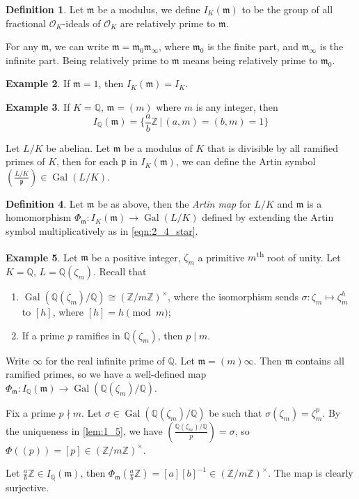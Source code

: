\documentclass[11pt]{article}
\theoremstyle{definition}
\newtheorem{definition}{Definition}[section]
\newtheorem{example}[definition]{Example}
\theoremstyle{plain}
\theoremstyle{remark}
\DeclareMathOperator{\Gal}{Gal}
\newcommand{\ZZ}{\mathbb{Z}}
\newcommand{\QQ}{\mathbb{Q}}
\newcommand{\cO}{\mathcal{O}}
\newcommand{\fp}{\mathfrak{p}}
\newcommand{\fm}{\mathfrak{m}}
\newcommand{\leg}[2]{\left(\frac{#1}{#2}\right)}
\begin{document}
\begin{definition}\label{def:2_7}
    Let $\fm$ be a modulus, we define $I_K(\fm)$ to be the group of all fractional $\cO_K$-ideals of $\cO_K$ are relatively prime to $\fm$.
\end{definition}

For any $\fm$, we can write $\fm = \fm_0 \fm_\infty$, where $\fm_0$ is the finite part, and $\fm_\infty$ is the infinite part. Being relatively prime to $\fm$ means being relatively prime to $\fm_0$.

\begin{example}\label{eg:2_8}
    If $\fm = 1$, then $I_K(\fm) = I_K$.
\end{example}

\begin{example}\label{eg:2_9}
    If $K = \QQ$, $\fm = (m)$ where $m$ is any integer, then
    \begin{equation*}
        I_\QQ(\fm) = \bigg\{ \frac{a}{b}\ZZ \,\bigg\vert\, (a, m) = (b, m) = 1 \bigg\}
    \end{equation*}
\end{example}

Let $L/K$ be abelian. Let $\fm$ be a modulus of $K$ that is divisible by all ramified primes of $K$, then for each $\fp$ in $I_K(\fm)$, we can define the Artin symbol $\leg{L/K}{\fp} \in \Gal(L/K)$.

\begin{definition}\label{def:2_10}
    Let $\fm$ be as above, then the \emph{Artin map} for $L/K$ and $\fm$ is a homomorphism $\Phi_{\fm} : I_K(\fm) \to \Gal(L/K)$ defined by extending the Artin symbol multiplicatively as in \eqref{eqn:2_4_star}.
\end{definition}

\begin{example}\label{eg:2_11}
    Let $\fm$ be a positive integer, $\zeta_m$ a primitive $m$\textsuperscript{th} root of unity. Let $K = \QQ$, $L = \QQ(\zeta_m)$. Recall that
    \begin{enumerate}
        \item $\Gal(\QQ(\zeta_m) / \QQ) \cong (\ZZ / m \ZZ)^\times$, where the isomorphism sends $\sigma : \zeta_m \mapsto \zeta_m^h$ to $[h]$, where $[h] = h \pmod{m}$;
        \item If a prime $p$ ramifies in $\QQ(\zeta_m)$, then $p \mid m$.
    \end{enumerate}
    Write $\infty$ for the real infinite prime of $\QQ$. Let $\fm = (m) \infty$. Then $\fm$ contains all ramified primes, so we have a well-defined map $\Phi_\fm : I_\QQ(\fm) \to \Gal(\QQ(\zeta_m) / \QQ)$.

    {\color{blue}
        Fix a prime $p \nmid m$. Let $\sigma \in \Gal(\QQ(\zeta_m) / \QQ)$ be such that $\sigma(\zeta_m) = \zeta_m^p$. By the uniqueness in \autoref{lem:1_5}, we have $\leg{\QQ(\zeta_m) / \QQ}{p} = \sigma$, so $\Phi((p)) = [p] \in (\ZZ / m \ZZ)^\times$.
    }

    Let $\frac{a}{b}\ZZ \in I_\QQ(\fm)$, then $\Phi_\fm(\frac{a}{b} \ZZ) = [a][b]^{-1} \in (\ZZ / m \ZZ)^\times$.
    The map is clearly surjective.
\end{example}
\end{document}
